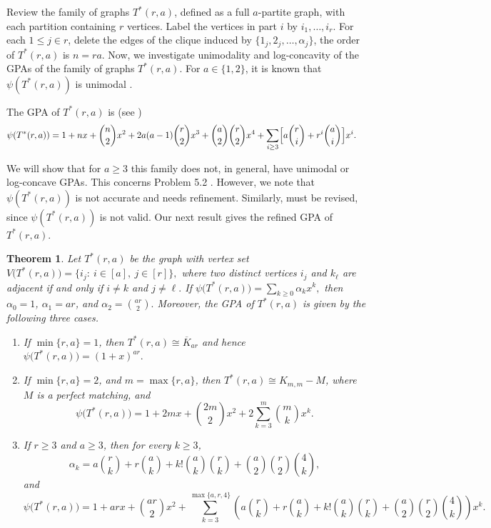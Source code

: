 \documentclass[12pt,twoside]{article}
\newtheorem{theorem}{Theorem}[section]
\begin{document}
	Review the family of graphs $T^*(r,a)$, defined as a full $a$-partite graph, with each partition containing $r$ vertices. Label the vertices in part $i$ by $i_1,\dots,i_r$. For each $1\leq j\in r$, delete the edges of the clique induced by	$\{1_j,2_j,\dots,\alpha_j\}$,  the order of $T^*(r,a)$ is $n=ra$. Now, we investigate unimodality and log-concavity of the GPAs of the family of graphs $T^*(r,a)$. For $a\in \{1,2\}$, it is known that $\psi(T^*(r,a))$ is unimodal \cite[Proposition 4.3]{0}.
	
	The GPA of $T^*(r,a)$ is (see \cite{0})
	\begin{align*}
		\psi(T^*(r,a))
		&= 1 + nx + \binom{n}{2}x^2 + 2a(a-1)\binom{r}{2}x^3 + \binom{a}{2}\binom{r}{2}x^4 + \sum_{i\ge 3} \Bigl[a\binom{r}{i} + r^i\binom{a}{i}\Bigr] x^i.
	\end{align*}
	
	We will show that for $a\ge 3$ this family does not, in general, have unimodal
	or log-concave GPAs. This concerns Problem 5.2 \cite{0}.	However, we note that $\psi(T^*(r,a))$ is not accurate and needs refinement. Similarly, \cite[Proposition 4.3]{0} must be revised, since $\psi(T^*(r,a))$ is not valid. Our next result gives the refined GPA of $T^*(r,a).$
		
		
		\begin{theorem}\label{thm:correct-gpa-Tstar}
			Let $T^*(r,a)$ be the graph with vertex set
			$
			V\bigl(T^*(r,a)\bigr)=\{ i_j:\ i\in [a],\ j\in [r] \},
			$
			where two distinct vertices $i_j$ and $k_\ell$ are adjacent if and only if
			$
			i\neq k $ and $ j\neq \ell.
			$
		If $\psi\bigl(T^*(r,a)\bigr)=\sum_{k\ge 0}\alpha_k x^k,$ then $\alpha_0=1$, $\alpha_1=ar$, and
			$
			\alpha_2=\binom{ar}{2}.
			$
			Moreover, the  GPA of $T^*(r,a)$ is given by the following three cases.
			\begin{enumerate}[label=\textup{(\roman*)}]
				\item If $\min\{r,a\}=1$, then $T^*(r,a)\cong \overline{K}_{ar}$ and hence
			$\psi\bigl(T^*(r,a)\bigr)=(1+x)^{ar}. $
			\item If $\min\{r,a\}=2$, and $m=\max\{r,a\}$, then $T^*(r,a)\cong K_{m,m}-M$, where $M$ is a perfect matching, and
			$$
			\psi\bigl(T^*(r,a)\bigr)
			=
			1+2mx+\binom{2m}{2}x^2+2\sum_{k=3}^{m}\binom{m}{k}x^k.
			$$
			\item If $r\ge 3$ and $a\ge 3$, then for every $k\ge 3$,
			$$
			\alpha_k
			=
			a\binom{r}{k}
			+
			r\binom{a}{k}
			+
			k!\binom{a}{k}\binom{r}{k}
			+
			\binom{a}{2}\binom{r}{2}\binom{4}{k},
			$$
			and
			{\footnotesize$$
			\psi\bigl(T^*(r,a)\bigr)
			=
			1+arx+\binom{ar}{2}x^2
			+
			\sum_{k=3}^{\max\{a,r,4\}}
			\left(
			a\binom{r}{k}
			+
			r\binom{a}{k}
			+
			k!\binom{a}{k}\binom{r}{k}
			+
			\binom{a}{2}\binom{r}{2}\binom{4}{k}
			\right)x^k.
			$$}
			\end{enumerate}
		\end{theorem}
		
\end{document}
